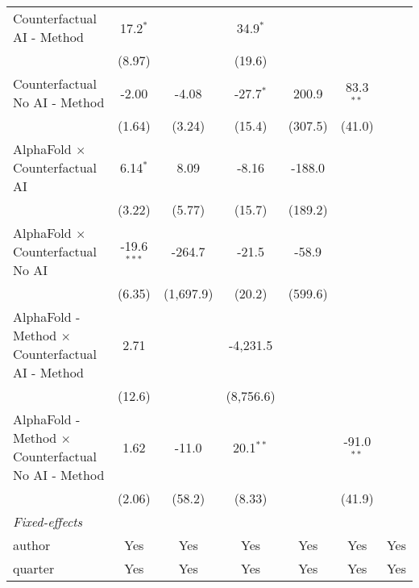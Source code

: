 \begin{tabular}{lcccccc}
   Counterfactual AI - Method                                 & 17.2$^{*}$    &            & 34.9$^{*}$  &               &              &   \\   
                                                              & (8.97)        &            & (19.6)      &               &              &   \\   
   Counterfactual No AI - Method                              & -2.00         & -4.08      & -27.7$^{*}$ & 200.9         & 83.3$^{**}$  &   \\   
                                                              & (1.64)        & (3.24)     & (15.4)      & (307.5)       & (41.0)       &   \\   
   AlphaFold $\times$ Counterfactual AI                       & 6.14$^{*}$    & 8.09       & -8.16       & -188.0        &              &   \\   
                                                              & (3.22)        & (5.77)     & (15.7)      & (189.2)       &              &   \\   
   AlphaFold $\times$ Counterfactual No AI                    & -19.6$^{***}$ & -264.7     & -21.5       & -58.9         &              &   \\   
                                                              & (6.35)        & (1,697.9)  & (20.2)      & (599.6)       &              &   \\   
   AlphaFold - Method $\times$ Counterfactual AI - Method     & 2.71          &            & -4,231.5    &               &              &   \\   
                                                              & (12.6)        &            & (8,756.6)   &               &              &   \\   
   AlphaFold - Method $\times$ Counterfactual No AI - Method  & 1.62          & -11.0      & 20.1$^{**}$ &               & -91.0$^{**}$ &   \\   
                                                              & (2.06)        & (58.2)     & (8.33)      &               & (41.9)       &   \\   
   \midrule
   \emph{Fixed-effects}\\
   author                                                     & Yes           & Yes        & Yes         & Yes           & Yes          & Yes\\  
   quarter                                                    & Yes           & Yes        & Yes         & Yes           & Yes          & Yes\\  

\end{tabular}
